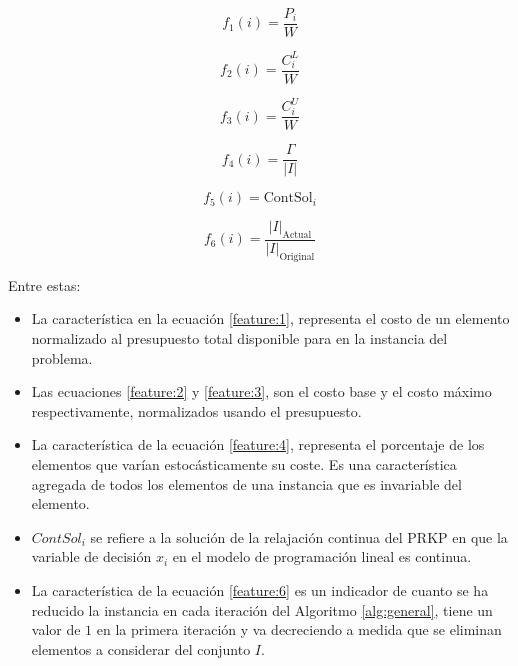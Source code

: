 \documentclass[spanish, a4paper, 12pt, openany,final]{book}
\begin{document}
\begin{multicols}{2}
	\label{eq:all_features}
	\begin{equation}
		f_1\left(i\right)   = \frac{P_i}{W}
		\label{feature:1}
	\end{equation}
	
	\begin{equation}
		f_2\left(i\right)   = \frac{C^L_i}{W}
		\label{feature:2}
	\end{equation}
	
	\begin{equation}
		f_3\left(i\right)   = \frac{C^U_i}{W}
		\label{feature:3}
	\end{equation}
	
	\begin{equation}
		f_4\left(i\right)   = \frac{\Gamma}{|I|}
		\label{feature:4}
	\end{equation}
	
	\begin{equation}
		f_5\left(i\right)   = \text{ContSol}_i
		\label{feature:5}
	\end{equation}
	
\begin{equation}
	\label{feature:6}
	f_6(i) = \frac{|I|_{\text{Actual}}}{|I|_\text{Original}}
\end{equation}	
\end{multicols}






Entre estas:
\begin{itemize}
	\item La característica en la ecuación \eqref{feature:1}, representa el costo de un elemento normalizado al presupuesto total disponible para en la instancia del problema.
	\item Las ecuaciones \eqref{feature:2} y \eqref{feature:3}, son el costo base y el costo máximo respectivamente, normalizados usando el presupuesto.
	\item La característica de la ecuación \eqref{feature:4}, representa el porcentaje de los elementos que varían estocásticamente su coste. Es una característica agregada de todos los elementos de una instancia que es invariable del elemento.
	
	\item $ContSol_i$ se refiere a la solución de la relajación continua del PRKP en que la variable de decisión $x_i$ en el modelo de programación lineal es continua.
	
	\item La característica de la ecuación \eqref{feature:6} es un indicador de cuanto se ha reducido la instancia en cada iteración del Algoritmo \ref{alg:general}, tiene un valor de $1$ en la primera iteración y va decreciendo a medida que se eliminan elementos a considerar del conjunto $I$.
	
\end{itemize}
\end{document}

